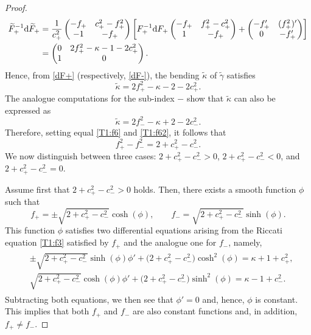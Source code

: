 \documentclass[pdftex]{sigma}
\numberwithin{equation}{section}
\def\bending{\kappa}
\begin{document}
\begin{proof}
	\begin{align*}
		\widetilde{F}_+^{-1}{\rm d}\widetilde{F}_+&{}=\frac{1}{c_+^2}\begin{pmatrix} -f_+ & c_+^2-f_+^2 \\ -1 & -f_+ \end{pmatrix}\biggl[F_+^{-1}{\rm d}F_+\begin{pmatrix} -f_+ & f_+^2-c_+^2 \\ 1 & -f_+\end{pmatrix}+\begin{pmatrix} -f_+' & (f_+^2)' \\ 0 & -f_+'\end{pmatrix} \biggr]\\
		&{}=\begin{pmatrix} 0 & 2f_+^2-\bending-1-2c_+^2 \\ 1 & 0 \end{pmatrix}.
	\end{align*}
	Hence, from \eqref{dF+} (respectively, \eqref{dF-}), the bending $\widetilde{\bending}$ of $\widetilde{\gamma}$ satisfies
	\begin{equation}\label{T1:f6}
		\widetilde{\bending}=2f_+^2-\bending-2-2c_+^2.
	\end{equation}
	The analogue computations for the sub-index $-$ show that $\widetilde{\bending}$ can also be expressed as
	\begin{equation}\label{T1:f62}
		\widetilde{\bending}=2f_-^2-\bending+2-2c_-^2.
	\end{equation}
	Therefore, setting equal \eqref{T1:f6} and \eqref{T1:f62}, it follows that
	\begin{equation*}%
		f_+^2-f_-^2=2+c_+^2-c_-^2.
	\end{equation*}
	We now distinguish between three cases: $2+c_+^2-c_-^2>0$, $2+c_+^2-c_-^2<0$, and $2+c_+^2-c_-^2=0$.
	
	Assume first that $2+c_+^2-c_-^2>0$ holds. Then, there exists a smooth function $\phi$ such that
	\begin{equation*}
		f_+=\pm\sqrt{2+c_+^2-c_-^2}\cosh(\phi),\qquad
		f_-=\sqrt{2+c_+^2-c_-^2}\sinh(\phi).
	\end{equation*}
	This function $\phi$ satisfies two differential equations arising from the Riccati equation \eqref{T1:f3} satisfied by $f_+$ and the analogue one for $f_-$, namely,
	\begin{gather*}
\begin{split}
&\pm\sqrt{2+c_+^2-c_-^2}\sinh(\phi)\phi'+\bigl(2+c_+^2-c_-^2\bigr)\cosh^2(\phi)=\bending+1+c_+^2,\\
&\sqrt{2+c_+^2-c_-^2}\cosh(\phi)\phi'+\bigl(2+c_+^2-c_-^2\bigr)\sinh^2(\phi)=\bending-1+c_-^2.
\end{split}
	\end{gather*}
	Subtracting both equations, we then see that $\phi'=0$ and, hence, $\phi$ is constant. This implies that both $f_+$ and $f_-$ are also constant functions and, in addition, $f_+\neq f_-$.
	

\end{proof}
\end{document}
